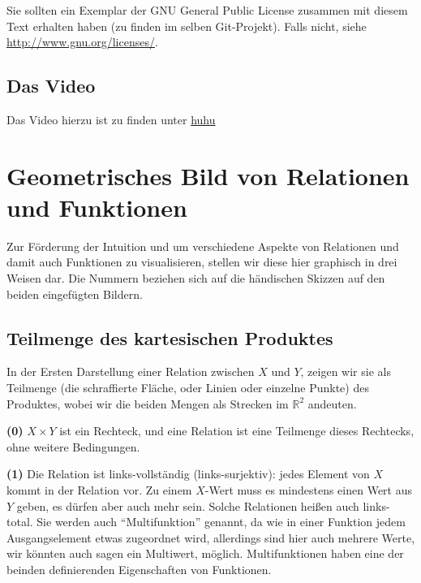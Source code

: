 \documentclass[a4paper]{amsart}
\theoremstyle{definition}
\newcommand{\R}{\ensuremath{\mathbb{ R }}}
\begin{document}
Sie sollten ein Exemplar der GNU General Public License zusammen mit diesem Text erhalten haben 
(zu finden im selben Git-Projekt). 
Falls nicht, siehe \url{http://www.gnu.org/licenses/}.

\subsection*{Das Video}
Das Video hierzu ist zu finden unter 
{\tiny
   \url{huhu}
}

\section{Geometrisches Bild von Relationen und Funktionen}

Zur Förderung der Intuition und um verschiedene Aspekte von Relationen und damit auch Funktionen zu visualisieren, stellen wir diese hier graphisch in drei Weisen dar. Die Nummern beziehen sich auf die händischen Skizzen auf den beiden eingefügten Bildern.

\subsection{Teilmenge des kartesischen Produktes}
In der Ersten Darstellung einer Relation zwischen $X$ und $Y$, zeigen wir sie als Teilmenge (die schraffierte Fläche, oder Linien oder einzelne Punkte) des Produktes, wobei wir die beiden Mengen als Strecken im $\R^2$ andeuten.

\textbf{(0)} $X \times Y$ ist ein Rechteck, und eine Relation ist eine Teilmenge dieses Rechtecks, ohne weitere Bedingungen.

\textbf{(1)} Die Relation ist links-vollständig (links-surjektiv): jedes Element von $X$ kommt in der Relation vor. Zu einem $X$-Wert muss es mindestens einen Wert aus $Y$ geben, es dürfen aber auch mehr sein. Solche Relationen heißen auch links-total. Sie werden auch "`Multifunktion"' genannt, da wie in einer Funktion jedem Ausgangselement etwas zugeordnet wird, allerdings sind hier auch mehrere Werte, wir könnten auch sagen ein Multiwert, möglich. Multifunktionen haben eine der beinden definierenden Eigenschaften von Funktionen.
\end{document}
